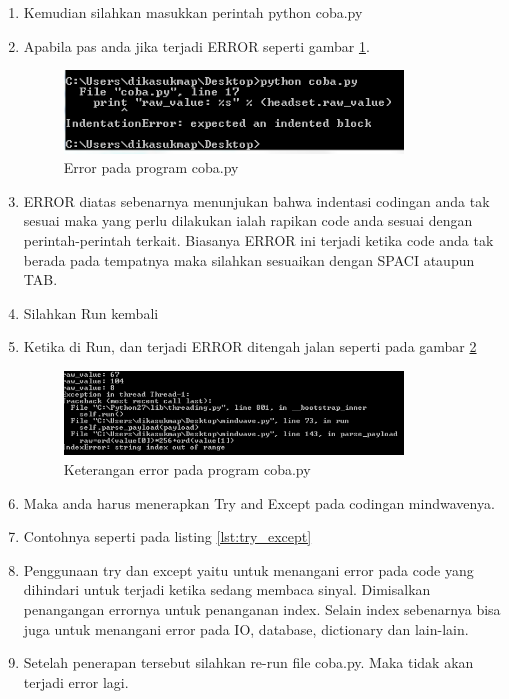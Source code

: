 \begin{enumerate}
\item Kemudian silahkan masukkan perintah python coba.py
\item Apabila pas anda jika terjadi ERROR seperti gambar \ref{fig:eksekusi_program}.
\begin{figure}[!htbp]
	\centerline{\includegraphics[width=0.85\textwidth]{figures/8/eksekusi_program.png}}
	\caption{Error pada program coba.py}
	\label{fig:eksekusi_program}
\end{figure}
\item ERROR diatas sebenarnya menunjukan bahwa indentasi codingan anda tak sesuai maka yang perlu dilakukan ialah rapikan code anda sesuai dengan perintah-perintah terkait. Biasanya ERROR ini terjadi ketika code anda tak berada pada tempatnya maka silahkan sesuaikan dengan SPACI ataupun TAB. 
\item Silahkan Run kembali
\item Ketika di Run, dan terjadi ERROR ditengah jalan seperti pada gambar \ref{fig:error_program}
\begin{figure}[!htbp]
	\centerline{\includegraphics[width=0.85\textwidth]{figures/8/error_program.png}}
	\caption{Keterangan error pada program coba.py}
	\label{fig:error_program}
\end{figure}
\item Maka anda harus menerapkan Try and Except pada codingan mindwavenya.
\item Contohnya seperti pada listing \ref{lst:try_except}

\item Penggunaan try dan except yaitu untuk menangani error pada code yang dihindari untuk terjadi ketika sedang membaca sinyal. Dimisalkan penangangan errornya untuk penanganan index. Selain index sebenarnya bisa juga untuk menangani error pada IO, database, dictionary dan lain-lain.
\item Setelah penerapan tersebut silahkan re-run file coba.py. Maka tidak akan terjadi error lagi.
\end{enumerate}

